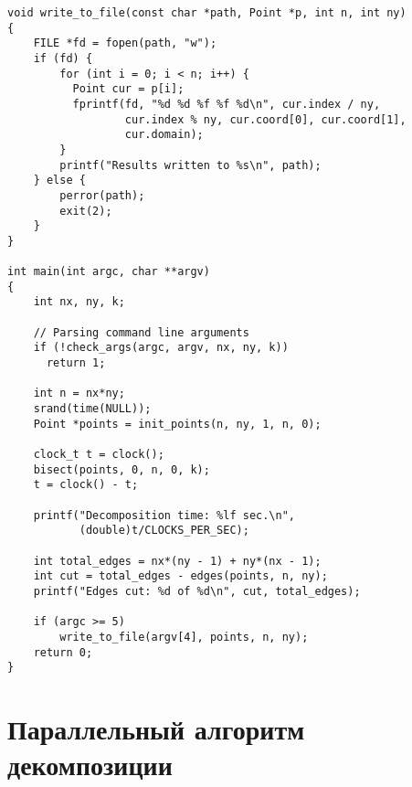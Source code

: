 \documentclass[oneside,final,14pt]{extreport}
\begin{document}
\begin{verbatim}
void write_to_file(const char *path, Point *p, int n, int ny)
{
    FILE *fd = fopen(path, "w");
    if (fd) {
        for (int i = 0; i < n; i++) {
          Point cur = p[i];
          fprintf(fd, "%d %d %f %f %d\n", cur.index / ny,
                  cur.index % ny, cur.coord[0], cur.coord[1],
                  cur.domain);
        }
        printf("Results written to %s\n", path);
    } else {
        perror(path);
        exit(2);
    }
}

int main(int argc, char **argv)
{
    int nx, ny, k;

    // Parsing command line arguments
    if (!check_args(argc, argv, nx, ny, k))
      return 1;

    int n = nx*ny;
    srand(time(NULL));
    Point *points = init_points(n, ny, 1, n, 0);

    clock_t t = clock();
    bisect(points, 0, n, 0, k);
    t = clock() - t;

    printf("Decomposition time: %lf sec.\n",
           (double)t/CLOCKS_PER_SEC);

    int total_edges = nx*(ny - 1) + ny*(nx - 1);
    int cut = total_edges - edges(points, n, ny);
    printf("Edges cut: %d of %d\n", cut, total_edges);

    if (argc >= 5)
        write_to_file(argv[4], points, n, ny);
    return 0;
}

\end{verbatim}

\chapter{Параллельный алгоритм декомпозиции} \label{app:par}
\begin{verbatim}
\end{verbatim}
\end{document}
